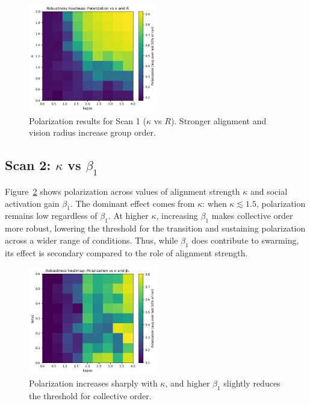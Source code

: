 \documentclass[11pt,a4paper]{article}
\begin{document}
\begin{figure}[H]
    \centering
    \includegraphics[width=0.5\textwidth]{k_vs_r.png}
    \caption{Polarization results for Scan 1 ($\kappa$ vs $R$). Stronger alignment and vision radius increase group order.}
    \label{fig:scan1}
\end{figure}

\subsection{Scan 2: $\kappa$ vs $\beta_1$}
Figure~\ref{fig:scan2} shows polarization across values of alignment strength $\kappa$ and social activation gain $\beta_1$. 
The dominant effect comes from $\kappa$: when $\kappa \lesssim 1.5$, polarization remains low regardless of $\beta_1$. 
At higher $\kappa$, increasing $\beta_1$ makes collective order more robust, lowering the threshold for the transition and sustaining polarization across a wider range of conditions. 
Thus, while $\beta_1$ does contribute to swarming, its effect is secondary compared to the role of alignment strength.

\begin{figure}[H]
    \centering
    \includegraphics[width=0.5\textwidth]{k_vs_b1.png}
    \caption{Polarization increases sharply with $\kappa$, and higher $\beta_1$ slightly reduces the threshold for collective order.}
    \label{fig:scan2}
\end{figure}
\end{document}
